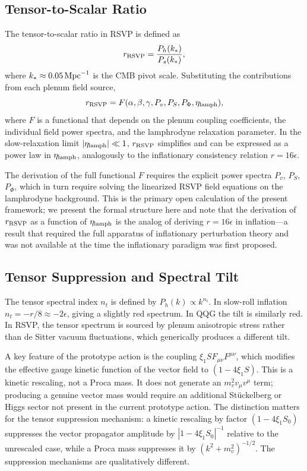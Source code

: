 \documentclass[12pt, a4paper]{article}
\newcommand{\etalamph}{\eta_{\rm lamph}}
\newcommand{\rRSVP}{r_{\rm RSVP}}
\newcommand{\Ph}{P_h}
\begin{document}
\subsection{Tensor-to-Scalar Ratio}

The tensor-to-scalar ratio in RSVP is defined as
\begin{equation}
\rRSVP = \frac{\Ph(k_*)}{P_s(k_*)},
\label{eq:rRSVP}
\end{equation}
where $k_* \approx 0.05\,{\rm Mpc}^{-1}$ is the CMB pivot scale. Substituting
the contributions from each plenum field source,
\begin{equation}
\rRSVP = F(\alpha, \beta, \gamma, P_v, P_S, P_\Phi, \etalamph),
\label{eq:rRSVP_general}
\end{equation}
where $F$ is a functional that depends on the plenum coupling coefficients, the
individual field power spectra, and the lamphrodyne relaxation parameter. In the
slow-relaxation limit $|\etalamph| \ll 1$, $\rRSVP$ simplifies and can be expressed
as a power law in $\etalamph$, analogously to the inflationary consistency relation
$r = 16\epsilon$.

The derivation of the full functional $F$ requires the explicit power spectra
$P_v$, $P_S$, $P_\Phi$, which in turn require solving the linearized RSVP field
equations on the lamphrodyne background. This is the primary open calculation
of the present framework; we present the formal structure here and note that
the derivation of $\rRSVP$ as a function of $\etalamph$ is the analog of deriving
$r = 16\epsilon$ in inflation---a result that required the full apparatus of
inflationary perturbation theory and was not available at the time the inflationary
paradigm was first proposed.

\subsection{Tensor Suppression and Spectral Tilt}

The tensor spectral index $n_t$ is defined by $\Ph(k) \propto k^{n_t}$. In
slow-roll inflation $n_t = -r/8 \approx -2\epsilon$, giving a slightly red
spectrum. In QQG the tilt is similarly red. In RSVP, the tensor spectrum is sourced
by plenum anisotropic stress rather than de Sitter vacuum fluctuations, which
generically produces a different tilt.

A key feature of the prototype action is the coupling $\xi_1 S F_{\mu\nu}F^{\mu\nu}$,
which modifies the effective gauge kinetic function of the vector field to
$(1 - 4\xi_1 S)$. This is a kinetic rescaling, not a Proca mass. It does not
generate an $m_v^2 v_\mu v^\mu$ term; producing a genuine vector mass would require
an additional Stückelberg or Higgs sector not present in the current prototype
action. The distinction matters for the tensor suppression mechanism: a kinetic
rescaling by factor $(1 - 4\xi_1 S_0)$ suppresses the vector propagator amplitude
by $|1 - 4\xi_1 S_0|^{-1}$ relative to the unrescaled case, while a Proca mass
suppresses it by $(k^2 + m_v^2)^{-1/2}$. The suppression mechanisms are
qualitatively different.
\end{document}
